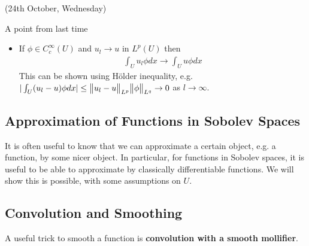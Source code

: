 \documentclass[10pt,a4paper]{report}
\begin{document}
\newday

(24th October, Wednesday)
\s

A point from last time 
\begin{itemize}
\item If $\phi \in C_c^{\infty} (U)$ and $u_l \rightarrow u$ in $L^p(U)$ then
\begin{align*}
\int_U u_l \phi dx \rightarrow \int_U u\phi dx
\end{align*}
This can be shown using H\"{o}lder inequality, e.g. $|\int_U (u_l -u)\phi dx| \leq \bigl\lVert u_l - u\bigr\rVert_{L^p} \bigl\lVert\phi\bigr\rVert_{L^q} \rightarrow 0$ as $l\rightarrow \infty$.
\end{itemize}
\s

\subsection*{Approximation of Functions in Sobolev Spaces}

It is often useful to know that we can approximate a certain object, e.g. a function, by some nicer object. In particular, for functions in Sobolev spaces, it is useful to be able to approximate by classically differentiable functions. We will show this is possible, with some assumptions on $U$.

\subsection*{Convolution and Smoothing}

A useful trick to smooth a function is \textbf{convolution with a smooth mollifier}.
\s
\end{document}
